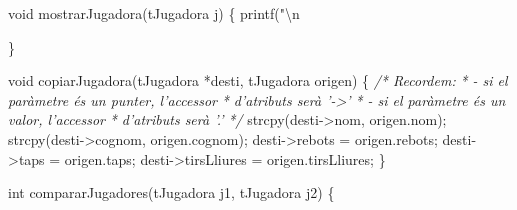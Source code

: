 \documentclass[]{book}
\newenvironment{Shaded}{\begin{snugshade}}{\end{snugshade}}
\newcommand{\DataTypeTok}[1]{\textcolor[rgb]{0.13,0.29,0.53}{#1}}
\newcommand{\SpecialCharTok}[1]{\textcolor[rgb]{0.00,0.00,0.00}{#1}}
\newcommand{\StringTok}[1]{\textcolor[rgb]{0.31,0.60,0.02}{#1}}
\newcommand{\CommentTok}[1]{\textcolor[rgb]{0.56,0.35,0.01}{\textit{#1}}}
\newcommand{\NormalTok}[1]{#1}
\begin{document}
\begin{Shaded}
\begin{Highlighting}[]
{{{{{{\DataTypeTok{void}\NormalTok{ mostrarJugadora(tJugadora j) \{}
\NormalTok{    printf(}\StringTok{"}\SpecialCharTok{\textbackslash{}n}\StringTok{%
\NormalTok{\}}

\DataTypeTok{void}\NormalTok{ copiarJugadora(tJugadora *desti, tJugadora origen) \{}
    \CommentTok{/* Recordem: }
\CommentTok{     * - si el paràmetre és un punter, l'accessor }
\CommentTok{     *   d'atributs serà '->'}
\CommentTok{     * - si el paràmetre és un valor, l'accessor}
\CommentTok{     *   d'atributs serà '.'}
\CommentTok{     */}
\NormalTok{    strcpy(desti->nom, origen.nom);}
\NormalTok{    strcpy(desti->cognom, origen.cognom);}
\NormalTok{    desti->rebots = origen.rebots;}
\NormalTok{    desti->taps = origen.taps;}
\NormalTok{    desti->tirsLliures = origen.tirsLliures;}
\NormalTok{\}}

\DataTypeTok{int}\NormalTok{ compararJugadores(tJugadora j1, tJugadora j2) \{}
    
}}}}}}}
\end{Highlighting}
\end{Shaded}
\end{document}
